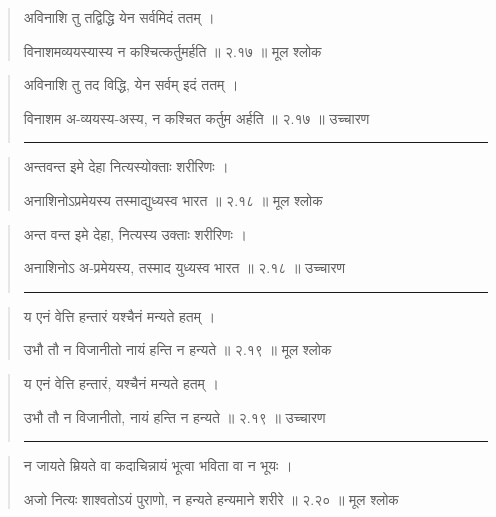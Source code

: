 \begin{quotation}

अविनाशि तु तद्विद्धि येन सर्वमिदं ततम्‌  ।  

विनाशमव्ययस्यास्य न कश्चित्कर्तुमर्हति  ॥ २.१७ ॥  मूल श्लोक
\end{quotation}

\begin{quotation}

अविनाशि तु तद विद्धि, येन सर्वम् इदं ततम्‌  ।  

विनाशम अ-व्ययस्य-अस्य, न कश्चित कर्तुम अर्हति  ॥ २.१७ ॥  उच्चारण

\noindent\rule{16cm}{0.4pt} 
\end{quotation}


\begin{quotation}

अन्तवन्त इमे देहा नित्यस्योक्ताः शरीरिणः  ।  

अनाशिनोऽप्रमेयस्य तस्माद्युध्यस्व भारत  ॥ २.१८ ॥  मूल श्लोक
\end{quotation}

\begin{quotation}

अन्त वन्त इमे देहा, नित्यस्य उक्ताः शरीरिणः  ।  

अनाशिनोऽ अ-प्रमेयस्य, तस्माद युध्यस्व भारत  ॥ २.१८ ॥  उच्चारण

\noindent\rule{16cm}{0.4pt} 
\end{quotation}


\begin{quotation}
य एनं वेत्ति हन्तारं यश्चैनं मन्यते हतम्‌  ।  

उभौ तौ न विजानीतो नायं हन्ति न हन्यते  ॥ २.१९ ॥  मूल श्लोक
\end{quotation}

\begin{quotation}

य एनं वेत्ति हन्तारं, यश्चैनं मन्यते हतम्‌  ।  

उभौ तौ न विजानीतो, नायं हन्ति न हन्यते  ॥ २.१९ ॥  उच्चारण

\noindent\rule{16cm}{0.4pt} 
\end{quotation}


\begin{quotation}

न जायते म्रियते वा कदाचिन्नायं भूत्वा भविता वा न भूयः  ।  

अजो नित्यः शाश्वतोऽयं पुराणो, न हन्यते हन्यमाने शरीरे  ॥ २.२० ॥  मूल श्लोक
\end{quotation}

